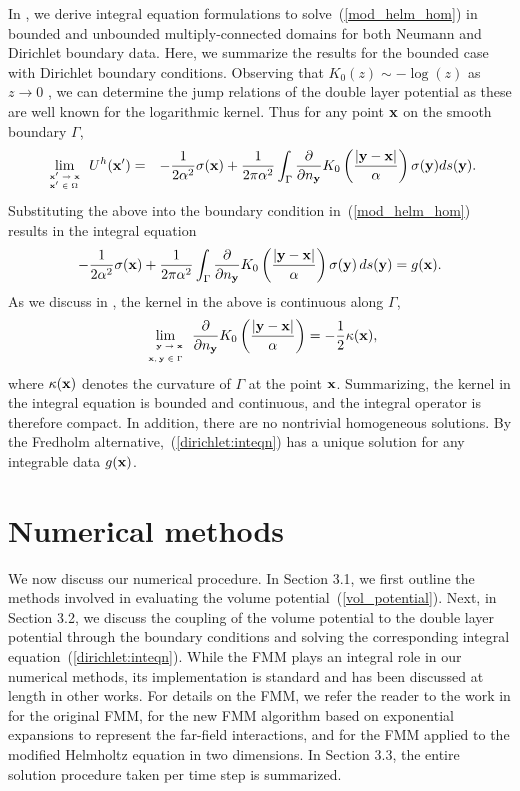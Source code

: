\documentclass[preprint,12pt]{elsarticle}
\newcommand{\x}{{\bf x}}
\newcommand{\y}{{\bf y}}
\newcommand{\pderiv}[2]{\frac{\partial #1}{\partial #2}}
\newcommand{\eqr}[1]{~(\ref{#1})}
\begin{document}
In \cite{KROP_QUAIFE_1}, we derive integral equation formulations to solve\eqr{mod_helm_hom} in bounded and unbounded multiply-connected domains for both Neumann and Dirichlet boundary data. 
Here, we summarize the results for the bounded case with Dirichlet boundary conditions.  
Observing that $K_0 (z) \sim -\log(z)$ as $z \rightarrow 0$ \cite{ABRAM}, 
we can determine the jump relations of the double layer potential as these are well known for the logarithmic kernel. 
Thus for any point $\x$ on the smooth boundary $\Gamma$,
\begin{eqnarray*}
  \lim_{\tiny{\begin{array}{l}
        \x'  \rightarrow  \x  \\
        \x'  \in  \Omega 
      \end{array} }}
  U^h(\x')& = &  - \frac{1}{2\alpha^2}\sigma(\x)+
  \frac{1}{2\pi\alpha^2}\int_{\Gamma}\pderiv{}{n_{\y}}
  K_{0}\left(\frac{|\y-\x|}{\alpha}\right)\sigma(\y)ds(\y).
\end{eqnarray*}
Substituting the above into the boundary condition in\eqr{mod_helm_hom} results in the integral equation 
\begin{equation}
  \label{dirichlet:inteqn}
 -\frac{1}{2\alpha^2}\sigma(\x)+\frac{1}{2\pi\alpha^2}
  \int_{\Gamma}\pderiv{}{n_{\y}}K_{0}\left(\frac{|\y - \x|}{\alpha}\right)
  \sigma(\y) \, ds(\y) = g(\x) .
\end{equation}
As we discuss in \cite{KROP_QUAIFE_1}, the kernel in the above is continuous along
$\Gamma$, 
\[
  \lim_{\tiny{\begin{array}{r}\y \rightarrow \x \smallskip \\
        \x, \y \in \Gamma
      \end{array} }}
  \pderiv{}{n_{\y}}K_{0}\left(\frac{|\y-\x|}{\alpha}\right) = 
  -\frac{1}{2}\kappa(\x),
\]
where $\kappa(\x)$ denotes the curvature of $\Gamma$ at the point
$\x$.
Summarizing, the kernel in the integral equation is bounded and continuous, and the integral operator is therefore compact. In addition, there are no nontrivial
homogeneous solutions. By the Fredholm alternative,\eqr{dirichlet:inteqn} has a unique solution for any integrable data
$g(\x)$.
\section{Numerical methods}
We now discuss our numerical procedure.
In Section 3.1, we first outline the methods involved in evaluating the volume potential\eqr{vol_potential}. 
Next, in Section 3.2, we discuss the coupling of the volume potential to the double layer potential through the boundary conditions and solving the corresponding integral equation\eqr{dirichlet:inteqn}. 
While the FMM plays an integral role in our numerical methods, its implementation is standard and has been discussed at length in other works. 
For details on the FMM, we refer the reader to the work in \cite{GR,CGR} for the original FMM, \cite{new_FMM} for the new FMM algorithm based on exponential expansions to represent the far-field interactions, and \cite{modified:helmholtz} for the FMM applied to the modified Helmholtz equation in two dimensions.
In Section 3.3, the entire solution procedure taken per time step is summarized.
\end{document}
